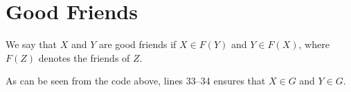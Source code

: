 %
%

\section{Good Friends}
We say that $X$ and $Y$ are good friends if $X \in F(Y)$ and $Y \in F(X)$,
where $F(Z)$ denotes the friends of $Z$.


As can be seen from the code above, lines 33--34 ensures that $X \in G$ and
$Y \in G$.
